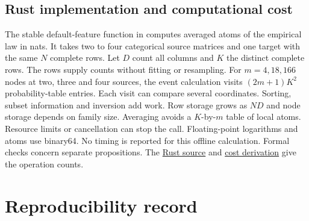 \documentclass[11pt]{article}
\begin{document}
\subsection*{Rust implementation and computational cost}
The stable default-feature function  in  computes averaged atoms of the empirical law in nats. It takes two to four categorical source matrices and one target with the same $N$ complete rows. Let $D$ count all columns and $K$ the distinct complete rows. The rows supply counts without fitting or resampling. For $m=4,18,166$ nodes at two, three and four sources, the event calculation visits $(2m+1)K^2$ probability-table entries. Each visit can compare several coordinates. Sorting, subset information and inversion add work. Row storage grows as $ND$ and node storage depends on family size. Averaging avoids a $K$-by-$m$ table of local atoms. Resource limits or cancellation can stop the call. Floating-point logarithms and atoms use binary64. No timing is reported for this offline calculation. Formal checks concern separate propositions. The \href{https://github.com/sepahead/pid-rs/blob/main/crates/pid-core/src/sxpid.rs}{Rust source} and \href{https://github.com/sepahead/pid-rs/blob/main/RUST_IMPLEMENTATION_AND_COST.md}{cost derivation} give the operation counts.

\section{Reproducibility record}
\end{document}

